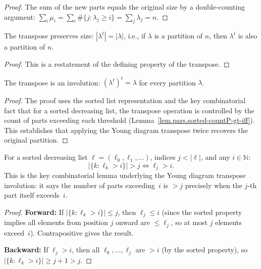 \begin{proof}
\leanok
The sum of the new parts equals the original size by a double-counting argument:
$\sum_i \mu_i = \sum_i \#\{j : \lambda_j \geq i\} = \sum_j \lambda_j = n$.
\end{proof}

\begin{lemma}
\label{lem.pars.transpose-size}
\leanhelper
\leanok
The transpose preserves size: $|\lambda^t| = |\lambda|$,
i.e., if $\lambda$ is a partition of $n$, then $\lambda^t$ is also a partition of $n$.
\end{lemma}

\begin{proof}
\leanok
This is a restatement of the defining property of the transpose.
\end{proof}

\begin{lemma}
\label{lem.pars.transpose-involution}
\leanhelper
\leanok
The transpose is an involution: $(\lambda^t)^t = \lambda$ for every partition $\lambda$.
\end{lemma}

\begin{proof}
\leanok
The proof uses the sorted list representation and the key combinatorial fact that
for a sorted decreasing list, the transpose operation is controlled by the
count of parts exceeding each threshold (Lemma~\ref{lem.pars.sorted-countP-gt-iff}).
This establishes that applying the Young diagram transpose twice recovers the original partition.
\end{proof}

\begin{lemma}
\label{lem.pars.sorted-countP-gt-iff}
\leanhelper
\leanok
For a sorted decreasing list $\ell = (\ell_0, \ell_1, \ldots)$,
indices $j < |\ell|$, and any $i\in\mathbb{N}$:
\[
|\{k : \ell_k > i\}| > j \iff \ell_j > i.
\]
This is the key combinatorial lemma underlying the Young diagram transpose involution:
it says the number of parts exceeding~$i$ is $>j$ precisely when
the $j$-th part itself exceeds~$i$.
\end{lemma}

\begin{proof}
\textbf{Forward:} If $|\{k : \ell_k > i\}| \le j$, then $\ell_j \le i$ (since
the sorted property implies all elements from position $j$ onward are $\le \ell_j$,
so at most $j$ elements exceed~$i$). Contrapositive gives the result.

\textbf{Backward:} If $\ell_j > i$, then all $\ell_0, \ldots, \ell_j$ are $> i$
(by the sorted property), so $|\{k : \ell_k > i\}| \ge j+1 > j$.
\end{proof}

